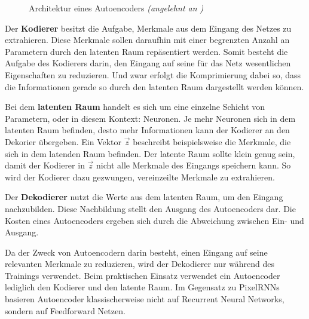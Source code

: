 \begin{figure}[h]
   \caption{Architektur eines Autoencoders \emph{(angelehnt an \cite{autoencoder-img})}}
   \label{fig:Autoencoder}
\end{figure}

Der \textbf{Kodierer} besitzt die Aufgabe, Merkmale aus dem Eingang des Netzes zu extrahieren. Diese Merkmale sollen daraufhin mit einer begrenzten Anzahl an Parametern durch den latenten Raum repäsentiert werden. Somit besteht die Aufgabe des Kodierers darin, den Eingang auf seine für das Netz wesentlichen Eigenschaften zu reduzieren. Und zwar erfolgt die Komprimierung dabei so, dass die Informationen gerade so durch den latenten Raum dargestellt werden können. \cite{autoencoder}

Bei dem \textbf{latenten Raum} handelt es sich um eine einzelne Schicht von Parametern, oder in diesem Kontext: Neuronen. Je mehr Neuronen sich in dem latenten Raum befinden, desto mehr Informationen kann der Kodierer an den Dekorier übergeben. Ein Vektor $\vec{z}$ beschreibt beispielsweise die Merkmale, die sich in dem latenden Raum befinden. Der latente Raum sollte klein genug sein, damit der Kodierer in $\vec{z}$ nicht alle Merkmale des Eingangs speichern kann. So wird der Kodierer dazu gezwungen, vereinzeilte Merkmale zu extrahieren. \cite{autoencoder}

Der \textbf{Dekodierer} nutzt die Werte aus dem latenten Raum, um den Eingang nachzubilden. Diese Nachbildung stellt den Ausgang des Autoencoders dar. Die Kosten eines Autoencoders ergeben sich durch die Abweichung zwischen Ein- und Ausgang. \cite{autoencoder}

Da der Zweck von Autoencodern darin besteht, einen Eingang auf seine relevanten Merkmale zu reduzieren, wird der Dekodierer nur während des Trainings verwendet. Beim praktischen Einsatz verwendet ein Autoencoder lediglich den Kodierer und den latente Raum. Im Gegensatz zu \acp{PixelRNN} basieren Autoencoder klassischerweise nicht auf Recurrent Neural Networks, sondern auf Feedforward Netzen. \cite{generativeModelsSurvey}

